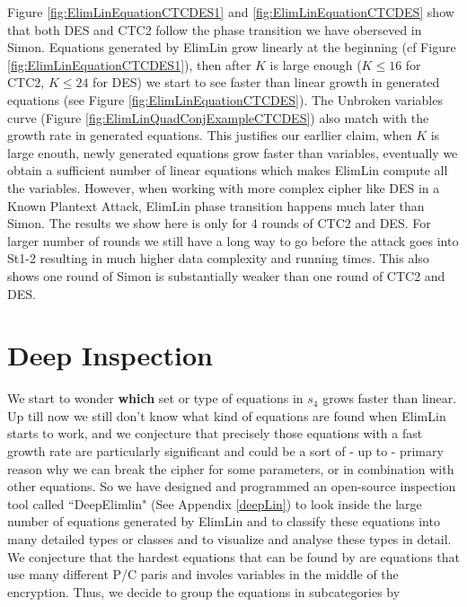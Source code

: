 Figure \ref{fig:ElimLinEquationCTCDES1} and \ref{fig:ElimLinEquationCTCDES} show that both DES and CTC2 follow the phase transition we have oberseved in Simon. Equations generated by ElimLin grow linearly at the beginning (cf Figure \ref{fig:ElimLinEquationCTCDES1}), then after $K$ is large enough ($K \leq 16$ for CTC2, $K \leq 24$ for DES) we start to see faster than linear growth in generated equations (see Figure \ref{fig:ElimLinEquationCTCDES}). The Unbroken variables curve (Figure \ref{fig:ElimLinQuadConjExampleCTCDES}) also match with the growth rate in generated equations. This justifies our earllier claim, when $K$ is large enouth, newly generated equations grow faster than variables, eventually we obtain a sufficient number of linear equations which makes ElimLin compute all the variables. However, when working with more complex cipher like DES in a Known Plantext Attack, ElimLin phase transition happens much later than Simon. The results we show here is only for 4 rounds of CTC2 and DES. For larger number of rounds we still have a long way to go before the attack goes into St1-2 resulting in much higher data complexity and running times. This also shows one round of Simon is substantially weaker than one round of CTC2 and DES. 


\section{Deep Inspection}
We start to wonder \textbf{which} set or type of equations in $s_4$ grows faster than linear. 
Up till now we still don't know what kind of equations are found when ElimLin starts to work, and we conjecture that precisely those equations with a fast growth rate are particularly significant and could be a sort of - up to - primary reason why we can break the cipher for some parameters, or in combination with other equations. 
So we have designed and programmed an open-source inspection tool called ``DeepElimlin" (See Appendix \ref{deepLin}) to look inside the large number of equations generated by ElimLin and to classify these equations into many detailed types or classes and to visualize and analyse these types in detail. We conjecture that the hardest equations that can be found by are equations that use many different P/C paris and involes variables in the middle of the encryption. Thus, we decide to group the equations in subcategories by 

